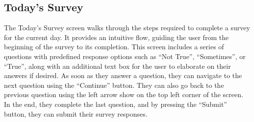 \vspace{5mm}

\subsection{Today's Survey}

The Today's Survey screen walks through the steps required to complete a survey for the current day. It provides an intuitive flow, guiding the user from the beginning of the survey to its completion. This screen includes a series of questions with predefined response options such as “Not True”, “Sometimes”, or “True”, along with an additional text box for the user to elaborate on their answers if desired. As soon as they answer a question, they can navigate to the next question using the ``Continue'' button. They can also go back to the previous question using the left arrow show on the top left corner of the screen. In the end, they complete the last question, and by pressing the ``Submit'' button, they can submit their survey responses.

\vspace{5mm}

